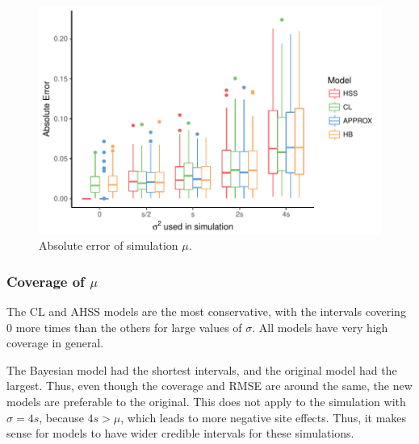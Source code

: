 \documentclass[AMA,STIX1COL]{WileyNJD-v2}\usepackage[]{graphicx}\usepackage[]{color}
\newenvironment{knitrout}{}{} %
\begin{document}
\begin{figure}
\caption{Absolute error of simulation $\mu$.}
\begin{knitrout}
\color{fgcolor}

{\centering \includegraphics[width=6in]{figure/unnamed-chunk-19-1} 

}



\end{knitrout}
\end{figure}

\subsubsection{Coverage of $\mu$}

The CL and AHSS models are the most conservative, with the intervals covering 0 more times than the  others for large values of $\sigma$. All models have very high coverage in general.

The Bayesian model had the shortest intervals, and the original model had the largest. Thus, even though the coverage and RMSE are around the same, the new models are preferable to the original. This does not apply to the simulation with $\sigma=4s$, because $4s>\mu$, which leads to more negative site effects. Thus, it makes sense for models to have wider credible intervals for these simulations. 
\end{document}
